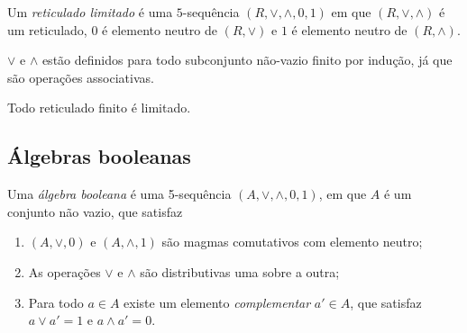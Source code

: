 \begin{definition}
Um \emph{reticulado limitado} é uma $5$-sequência $(R,\vee,\wedge,0,1)$ em que $(R,\vee,\wedge)$ é um reticulado, $0$ é elemento neutro de $(R,\vee)$ e $1$ é elemento neutro de $(R,\wedge)$.
\end{definition}

$\vee$ e $\wedge$ estão definidos para todo subconjunto não-vazio finito por indução, já que são operações associativas.

\begin{proposition}
Todo reticulado finito é limitado.
\end{proposition}

\subsection{Álgebras booleanas}
\begin{definition}
Uma \emph{álgebra booleana} é uma 5-sequência $(A, \vee ,\wedge, 0, 1)$, em que $A$ é um conjunto não vazio, que satisfaz
	\begin{enumerate}
	\item $(A,\vee,0)$ e $(A,\wedge,1)$ são magmas comutativos com elemento neutro;
	\item As operações $ \vee $ e $\wedge$ são distributivas uma sobre a outra;
	\item Para todo $a \in A$ existe um elemento \emph{complementar} $a' \in A$, que satisfaz $a \vee a'=1$ e $a \wedge a' = 0$.
	\end{enumerate}
\end{definition}

